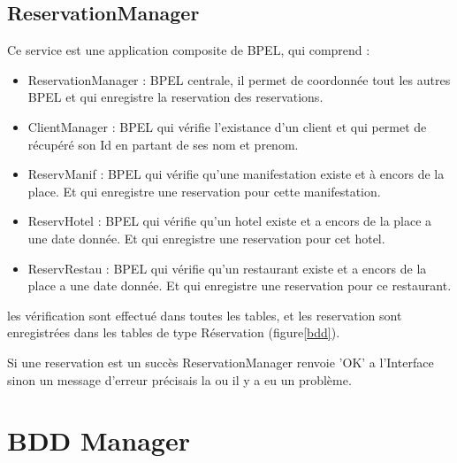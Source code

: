 	\subsection{ReservationManager}

		Ce service est une application composite de BPEL, qui comprend :
		\begin{itemize}
		  \item ReservationManager : BPEL centrale, il permet de coordonnée tout les
		  autres BPEL et qui enregistre la reservation des reservations.
		  \item ClientManager : BPEL qui vérifie l'existance d'un client et qui
		  permet de récupéré son Id en partant de ses nom et prenom.
		  \item ReservManif : BPEL qui vérifie qu'une manifestation existe et à encors
		  de la place. Et qui enregistre une reservation pour cette manifestation.
		  \item ReservHotel : BPEL qui vérifie qu'un hotel existe et a encors de la
		  place a une date donnée. Et qui enregistre une reservation pour cet hotel.
		  \item ReservRestau : BPEL qui vérifie qu'un restaurant existe et a encors de
		  la place a une date donnée. Et qui enregistre une reservation pour ce
		  restaurant.
		\end{itemize}
		
		les vérification sont effectué dans toutes les tables, et les reservation sont
		enregistrées dans les tables de type Réservation (figure\ref{bdd}).
		
		Si une reservation est un succès ReservationManager renvoie 'OK' a l'Interface
		sinon un message d'erreur précisais la ou il y a eu un problème.

\section{BDD Manager}

\clearpage




















